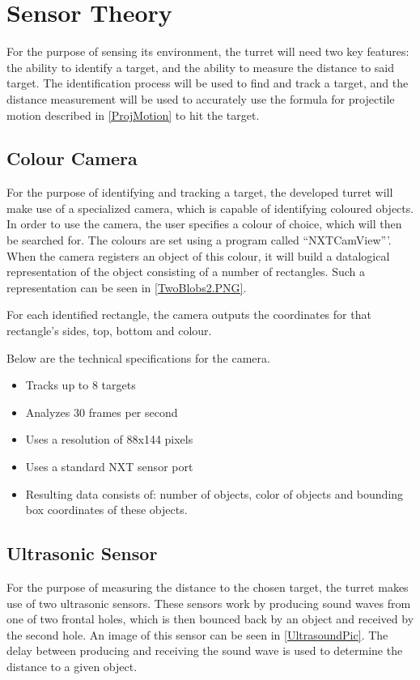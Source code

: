 \section{Sensor Theory}\label{SensorTheory}
For the purpose of sensing its environment, the turret will need two key
features: the ability to identify a target, and the ability to measure the
distance to said target. The identification process will be used to find and
track a target, and the distance measurement will be used to accurately use the
formula for projectile motion described in \autoref{ProjMotion} to hit the
target.

\subsection{Colour Camera}\label{SensTheoCam}
For the purpose of identifying and tracking a target, the developed turret will
make use of a specialized camera, which is capable of identifying coloured
objects. In order to use the camera, the user specifies a colour of choice,
which will then be searched for. The colours are set using a program called
``NXTCamView'''. When the camera registers an object of this colour, it
will build a datalogical representation of the object consisting of a number of rectangles. Such a representation can be seen in
\autoref{TwoBlobs2.PNG}. 


For each identified rectangle, the camera outputs the coordinates for that
rectangle's sides, top, bottom and colour. 

Below are the technical specifications \citep[p. 1]{NXTCam} for the camera.
\begin{itemize}
  \item Tracks up to 8 targets
  \item Analyzes 30 frames per second
  \item Uses a resolution of 88x144 pixels
  \item Uses a standard NXT sensor port
  \item Resulting data consists of: number of objects, color of objects and
  bounding box coordinates of these objects.
\end{itemize}

\subsection{Ultrasonic Sensor}\label{SensTheoUltra}
For the purpose of measuring the distance to the chosen target, the turret makes
use of two ultrasonic sensors. These sensors work by producing sound waves from
one of two frontal holes, which is then bounced back by an object and received
by the second hole. An image of this sensor can be seen in
\autoref{UltrasoundPic}. The delay between producing and receiving the sound
wave is used to determine the distance to a given object.

